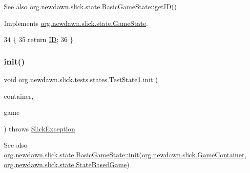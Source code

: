 \begin{DoxySeeAlso}{See also}
\mbox{\hyperlink{classorg_1_1newdawn_1_1slick_1_1state_1_1_basic_game_state_a781ce2b3d6dd9b9853adb011f5e75cf7}{org.\+newdawn.\+slick.\+state.\+Basic\+Game\+State\+::get\+I\+D()}} 
\end{DoxySeeAlso}


Implements \mbox{\hyperlink{interfaceorg_1_1newdawn_1_1slick_1_1state_1_1_game_state_a54f2bc6a91feaf0614a5ef19f1d03313}{org.\+newdawn.\+slick.\+state.\+Game\+State}}.


\begin{DoxyCode}
34                        \{
35         \textcolor{keywordflow}{return} \mbox{\hyperlink{classorg_1_1newdawn_1_1slick_1_1tests_1_1states_1_1_test_state1_aa33950fef3d2a1cef2d14a7475796e97}{ID}};
36     \}
\end{DoxyCode}
\mbox{\label{classorg_1_1newdawn_1_1slick_1_1tests_1_1states_1_1_test_state1_aac578ad98e5a4631d030cb36d8d421de}} 
\subsubsection{\texorpdfstring{init()}{init()}}
{\footnotesize\ttfamily void org.\+newdawn.\+slick.\+tests.\+states.\+Test\+State1.\+init (\begin{DoxyParamCaption}\item[{\mbox{\hyperlink{classorg_1_1newdawn_1_1slick_1_1_game_container}{Game\+Container}}}]{container,  }\item[{\mbox{\hyperlink{classorg_1_1newdawn_1_1slick_1_1state_1_1_state_based_game}{State\+Based\+Game}}}]{game }\end{DoxyParamCaption}) throws \mbox{\hyperlink{classorg_1_1newdawn_1_1slick_1_1_slick_exception}{Slick\+Exception}}\hspace{0.3cm}{\ttfamily [inline]}}

\begin{DoxySeeAlso}{See also}
\mbox{\hyperlink{interfaceorg_1_1newdawn_1_1slick_1_1state_1_1_game_state_aa799a369e0fcfe6822d2d586fa6f5bbc}{org.\+newdawn.\+slick.\+state.\+Basic\+Game\+State\+::init}}(\mbox{\hyperlink{classorg_1_1newdawn_1_1slick_1_1_game_container}{org.\+newdawn.\+slick.\+Game\+Container}}, \mbox{\hyperlink{classorg_1_1newdawn_1_1slick_1_1state_1_1_state_based_game}{org.\+newdawn.\+slick.\+state.\+State\+Based\+Game}}) 
\end{DoxySeeAlso}



